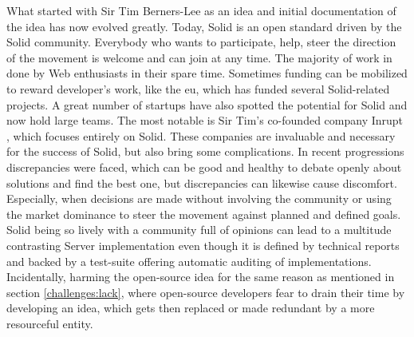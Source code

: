 What started with Sir Tim Berners-Lee as an idea and initial documentation of the idea has now evolved greatly. Today, Solid is an open standard driven by the Solid community. Everybody who wants to participate, help, steer the direction of the movement is welcome and can join at any time. The majority of work in done by Web enthusiasts in their spare time. Sometimes funding can be mobilized to reward developer's work, like the \gls{eu}, which has funded several Solid-related projects. A great number of startups have also spotted the potential for Solid and now hold large teams. The most notable is Sir Tim's co-founded company Inrupt \cite{inrupt}, which focuses entirely on Solid. These companies are invaluable and necessary for the success of Solid, but also bring some complications. In recent progressions discrepancies were faced, which can be good and healthy to debate openly about solutions and find the best one, but discrepancies can likewise cause discomfort. Especially, when decisions are made without involving the community or using the market dominance to steer the movement against planned and defined goals.
Solid being so lively with a community full of opinions can lead to a multitude contrasting Server implementation even though it is defined by technical reports and backed by a test-suite offering automatic auditing of implementations. Incidentally, harming the open-source idea for the same reason as mentioned in section \ref{challenges:lack}, where open-source developers fear to drain their time by developing an idea, which gets then replaced or made redundant by a more resourceful entity.
